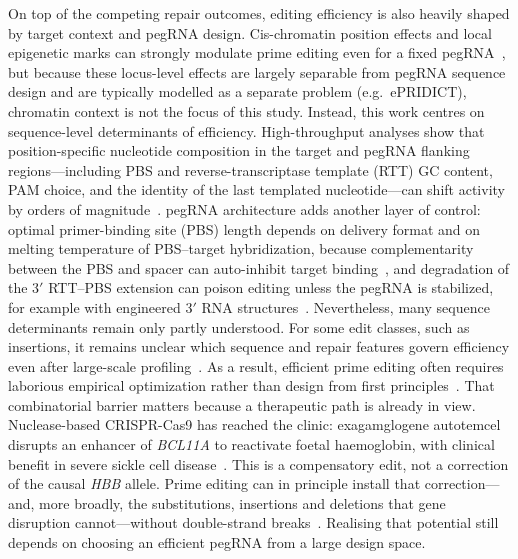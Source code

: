 \documentclass{article}
\begin{document}
On top of the competing repair outcomes, editing efficiency is also heavily shaped by target context and pegRNA design.
Cis-chromatin position effects and local epigenetic marks can strongly modulate prime editing even for a fixed pegRNA~\cite{liChromatinContextdependentRegulation2024,mathisMachineLearningPrediction2024}, but because these locus-level effects are largely separable from pegRNA sequence design and are typically modelled as a separate problem (e.g.\ ePRIDICT), chromatin context is not the focus of this study.
Instead, this work centres on sequence-level determinants of efficiency.
High-throughput analyses show that position-specific nucleotide composition in the target and pegRNA flanking regions---including PBS and reverse-transcriptase template (RTT) GC content, PAM choice, and the identity of the last templated nucleotide---can shift activity by orders of magnitude~\cite{kimPredictingEfficiencyPrime2021,kimChromatinStructureContextdependent2023}.
pegRNA architecture adds another layer of control: optimal primer-binding site (PBS) length depends on delivery format and on melting temperature of PBS--target hybridization, because complementarity between the PBS and spacer can auto-inhibit target binding~\cite{ponnienselvanReducingInherentAutoinhibitory2023}, and degradation of the 3$'$ RTT--PBS extension can poison editing unless the pegRNA is stabilized, for example with engineered 3$'$ RNA structures~\cite{nelsonEngineeredPegRNAsImprove2022}.
Nevertheless, many sequence determinants remain only partly understood.
For some edit classes, such as insertions, it remains unclear which sequence and repair features govern efficiency even after large-scale profiling~\cite{koeppelPredictionPrimeEditing2023}.
As a result, efficient prime editing often requires laborious empirical optimization rather than design from first principles~\cite{kimChromatinStructureContextdependent2023,domanDesigningExecutingPrime2022,hsuMechanisticMachineLearning2026}.
That combinatorial barrier matters because a therapeutic path is already in view.
Nuclease-based CRISPR-Cas9 has reached the clinic: exagamglogene autotemcel disrupts an enhancer of \textit{BCL11A} to reactivate foetal haemoglobin, with clinical benefit in severe sickle cell disease~\cite{frangoulExagamglogeneAutotemcelSevere2024}.
This is a compensatory edit, not a correction of the causal \textit{HBB} allele.
Prime editing can in principle install that correction---and, more broadly, the substitutions, insertions and deletions that gene disruption cannot---without double-strand breaks~\cite{anzaloneSearchandreplaceGenomeEditing2019,everetteExVivoPrime2023}.
Realising that potential still depends on choosing an efficient pegRNA from a large design space.
\end{document}

